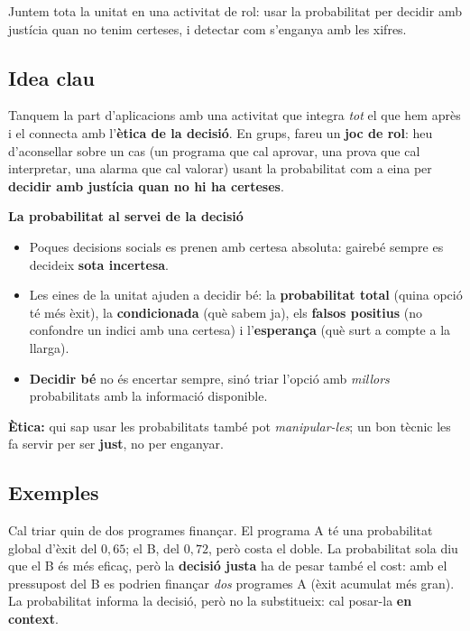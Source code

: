 %
{Juntem tota la unitat en una activitat de rol: usar la probabilitat per decidir amb justícia quan no tenim certeses, i detectar com s'enganya amb les xifres.}

\subsection{Idea clau}

Tanquem la part d'aplicacions amb una activitat que integra \emph{tot} el que hem après
i el connecta amb l'\textbf{ètica de la decisió}. En grups, fareu un \textbf{joc de rol}:
heu d'aconsellar sobre un cas (un programa que cal aprovar, una prova que cal
interpretar, una alarma que cal valorar) usant la probabilitat com a eina per
\textbf{decidir amb justícia quan no hi ha certeses}.

\begin{idea}
\textbf{La probabilitat al servei de la decisió}
\begin{itemize}[leftmargin=1.4em, itemsep=2pt]
  \item Poques decisions socials es prenen amb certesa absoluta: gairebé sempre es
        decideix \textbf{sota incertesa}.
  \item Les eines de la unitat ajuden a decidir bé: la \textbf{probabilitat total}
        (quina opció té més èxit), la \textbf{condicionada} (què sabem ja), els
        \textbf{falsos positius} (no confondre un indici amb una certesa) i
        l'\textbf{esperança} (què surt a compte a la llarga).
  \item \textbf{Decidir bé} no és encertar sempre, sinó triar l'opció amb \emph{millors}
        probabilitats amb la informació disponible.
\end{itemize}
\textbf{Ètica:} qui sap usar les probabilitats també pot \emph{manipular-les}; un bon
tècnic les fa servir per ser \textbf{just}, no per enganyar.
\end{idea}

\subsection{Exemples}

\begin{exemple}
Cal triar quin de dos programes finançar. El programa A té una probabilitat global
d'èxit del $0,65$; el B, del $0,72$, però costa el doble. La probabilitat sola diu que
el B és més eficaç, però la \textbf{decisió justa} ha de pesar també el cost: amb el
pressupost del B es podrien finançar \emph{dos} programes A (èxit acumulat més gran).
La probabilitat informa la decisió, però no la substitueix: cal posar-la \textbf{en
context}.
\end{exemple}

